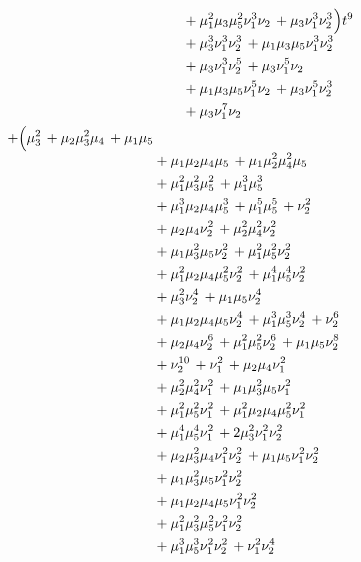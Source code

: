 \documentclass[10pt]{article}
\begin{document}
\[\begin{aligned}
\begin{aligned}[t]
  &{}+\mu_1^{2}\mu_3\mu_5^{2}\nu_1^{3}\nu_2\,+\mu_3\nu_1^{3}\nu_2^{3} \\
  &{}+\mu_3^{3}\nu_1^{3}\nu_2^{3}\,+\mu_1\mu_3\mu_5\nu_1^{3}\nu_2^{3} \\
  &{}+\mu_3\nu_1^{3}\nu_2^{5}\,+\mu_3\nu_1^{5}\nu_2 \\
  &{}+\mu_1\mu_3\mu_5\nu_1^{5}\nu_2\,+\mu_3\nu_1^{5}\nu_2^{3} \\
  &{}+\mu_3\nu_1^{7}\nu_2\end{aligned}\Bigr)t^{9} \\
  + \Bigl(\begin{aligned}[t]\mu_3^{2}\,+\mu_2\mu_3^{2}\mu_4\,+\mu_1\mu_5 \\
  &{}+\mu_1\mu_2\mu_4\mu_5\,+\mu_1\mu_2^{2}\mu_4^{2}\mu_5 \\
  &{}+\mu_1^{2}\mu_3^{2}\mu_5^{2}\,+\mu_1^{3}\mu_5^{3} \\
  &{}+\mu_1^{3}\mu_2\mu_4\mu_5^{3}\,+\mu_1^{5}\mu_5^{5}\,+\nu_2^{2} \\
  &{}+\mu_2\mu_4\nu_2^{2}\,+\mu_2^{2}\mu_4^{2}\nu_2^{2} \\
  &{}+\mu_1\mu_3^{2}\mu_5\nu_2^{2}\,+\mu_1^{2}\mu_5^{2}\nu_2^{2} \\
  &{}+\mu_1^{2}\mu_2\mu_4\mu_5^{2}\nu_2^{2}\,+\mu_1^{4}\mu_5^{4}\nu_2^{2} \\
  &{}+\mu_3^{2}\nu_2^{4}\,+\mu_1\mu_5\nu_2^{4} \\
  &{}+\mu_1\mu_2\mu_4\mu_5\nu_2^{4}\,+\mu_1^{3}\mu_5^{3}\nu_2^{4}\,+\nu_2^{6} \\
  &{}+\mu_2\mu_4\nu_2^{6}\,+\mu_1^{2}\mu_5^{2}\nu_2^{6}\,+\mu_1\mu_5\nu_2^{8} \\
  &{}+\nu_2^{10}\,+\nu_1^{2}\,+\mu_2\mu_4\nu_1^{2} \\
  &{}+\mu_2^{2}\mu_4^{2}\nu_1^{2}\,+\mu_1\mu_3^{2}\mu_5\nu_1^{2} \\
  &{}+\mu_1^{2}\mu_5^{2}\nu_1^{2}\,+\mu_1^{2}\mu_2\mu_4\mu_5^{2}\nu_1^{2} \\
  &{}+\mu_1^{4}\mu_5^{4}\nu_1^{2}\,+2\mu_3^{2}\nu_1^{2}\nu_2^{2} \\
  &{}+\mu_2\mu_3^{2}\mu_4\nu_1^{2}\nu_2^{2}\,+\mu_1\mu_5\nu_1^{2}\nu_2^{2} \\
  &{}+\mu_1\mu_3^{2}\mu_5\nu_1^{2}\nu_2^{2} \\
  &{}+\mu_1\mu_2\mu_4\mu_5\nu_1^{2}\nu_2^{2} \\
  &{}+\mu_1^{2}\mu_3^{2}\mu_5^{2}\nu_1^{2}\nu_2^{2} \\
  &{}+\mu_1^{3}\mu_5^{3}\nu_1^{2}\nu_2^{2}\,+\nu_1^{2}\nu_2^{4} \\

\end{aligned}
\end{aligned}\]
\end{document}
